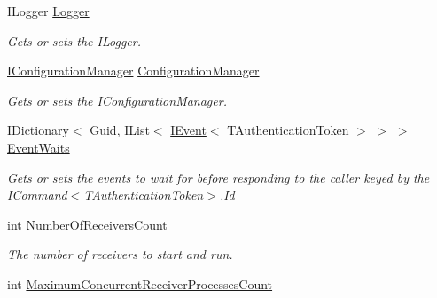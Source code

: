 \begin{DoxyCompactItemize}
I\+Logger \hyperlink{classCqrs_1_1Azure_1_1ServiceBus_1_1AzureBus_ad9bfb86c6f7724ce0729d45ddad4fbf5_ad9bfb86c6f7724ce0729d45ddad4fbf5}{Logger}
\begin{DoxyCompactList}\small\item\em Gets or sets the I\+Logger. \end{DoxyCompactList}\item 
\hyperlink{interfaceCqrs_1_1Configuration_1_1IConfigurationManager}{I\+Configuration\+Manager} \hyperlink{classCqrs_1_1Azure_1_1ServiceBus_1_1AzureBus_aaf9469d220fb23cb0521fa76b25ab228_aaf9469d220fb23cb0521fa76b25ab228}{Configuration\+Manager}
\begin{DoxyCompactList}\small\item\em Gets or sets the I\+Configuration\+Manager. \end{DoxyCompactList}\item 
I\+Dictionary$<$ Guid, I\+List$<$ \hyperlink{interfaceCqrs_1_1Events_1_1IEvent}{I\+Event}$<$ T\+Authentication\+Token $>$ $>$ $>$ \hyperlink{classCqrs_1_1Azure_1_1ServiceBus_1_1AzureBus_ae3c0fd5566add5441bb70b48eceb98be_ae3c0fd5566add5441bb70b48eceb98be}{Event\+Waits}
\begin{DoxyCompactList}\small\item\em Gets or sets the \hyperlink{}{events} to wait for before responding to the caller keyed by the I\+Command$<$\+T\+Authentication\+Token$>$.\+Id \end{DoxyCompactList}\item 
int \hyperlink{classCqrs_1_1Azure_1_1ServiceBus_1_1AzureBus_a65ca2b61bf8f2dba9d0e0f54ec64c2b9_a65ca2b61bf8f2dba9d0e0f54ec64c2b9}{Number\+Of\+Receivers\+Count}
\begin{DoxyCompactList}\small\item\em The number of receivers to start and run. \end{DoxyCompactList}\item 
int \hyperlink{classCqrs_1_1Azure_1_1ServiceBus_1_1AzureBus_a6b517888d91c6a5b026cb5857e75a04f_a6b517888d91c6a5b026cb5857e75a04f}{Maximum\+Concurrent\+Receiver\+Processes\+Count}
\item 

\end{DoxyCompactItemize}
